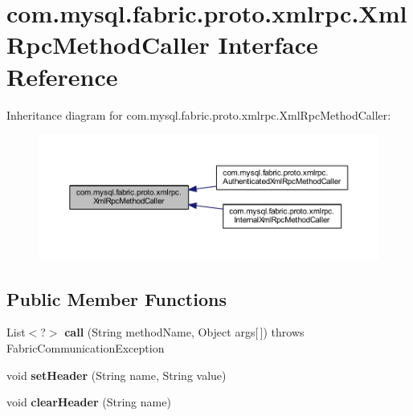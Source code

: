 \hypertarget{interfacecom_1_1mysql_1_1fabric_1_1proto_1_1xmlrpc_1_1_xml_rpc_method_caller}{}\section{com.\+mysql.\+fabric.\+proto.\+xmlrpc.\+Xml\+Rpc\+Method\+Caller Interface Reference}
\label{interfacecom_1_1mysql_1_1fabric_1_1proto_1_1xmlrpc_1_1_xml_rpc_method_caller}


Inheritance diagram for com.\+mysql.\+fabric.\+proto.\+xmlrpc.\+Xml\+Rpc\+Method\+Caller\+:\nopagebreak
\begin{figure}[H]
\begin{center}
\leavevmode
\includegraphics[width=350pt]{interfacecom_1_1mysql_1_1fabric_1_1proto_1_1xmlrpc_1_1_xml_rpc_method_caller__inherit__graph}
\end{center}
\end{figure}
\subsection*{Public Member Functions}
\begin{DoxyCompactItemize}
\item 
\mbox{\label{interfacecom_1_1mysql_1_1fabric_1_1proto_1_1xmlrpc_1_1_xml_rpc_method_caller_af53246361ede9256f0b068361362dbe1}} 
List$<$?$>$ {\bfseries call} (String method\+Name, Object args\mbox{[}$\,$\mbox{]})  throws Fabric\+Communication\+Exception
\item 
\mbox{\label{interfacecom_1_1mysql_1_1fabric_1_1proto_1_1xmlrpc_1_1_xml_rpc_method_caller_a7afc527aa30a5af765d44848bec5ed68}} 
void {\bfseries set\+Header} (String name, String value)
\item 
\mbox{\label{interfacecom_1_1mysql_1_1fabric_1_1proto_1_1xmlrpc_1_1_xml_rpc_method_caller_a850ff49f5d424d12a7fbdd7bb09df0c8}} 
void {\bfseries clear\+Header} (String name)
\end{DoxyCompactItemize}


